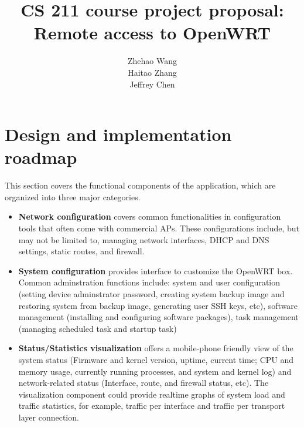 \documentclass{sig-alternate-05-2015}
\begin{document}
\title{CS 211 course project proposal: \\Remote access to OpenWRT}


\author{
\alignauthor
Zhehao Wang \\
\alignauthor
Haitao Zhang \\
\alignauthor 
Jeffrey Chen
}

\maketitle


\section{Design and implementation roadmap}

This section covers the functional components of the application, which are organized into three major categories.

\begin{itemize}

\item
\textbf{Network configuration} covers common functionalities in configuration tools that often come with commercial APs. These configurations include, but may not be limited to, managing network interfaces, DHCP and DNS settings, static routes, and firewall.

\item
\textbf{System configuration} provides interface to customize the OpenWRT box. Common adminstration functions include: system and user configuration (setting device adminstrator password, creating system backup image and restoring system from backup image, generating user SSH keys, etc), software management (installing and configuring software packages), task management (managing scheduled task and startup task)

\item
\textbf{Status/Statistics visualization} offers a mobile-phone friendly view of the system status (Firmware and kernel version, uptime, current time; CPU and memory usage, currently running processes, and system and kernel log) and network-related status (Interface, route, and firewall status, etc). The visualization component could provide realtime graphs of system load and traffic statistics, for example, traffic per interface and traffic per transport layer connection.

\end{itemize}
\end{document}
